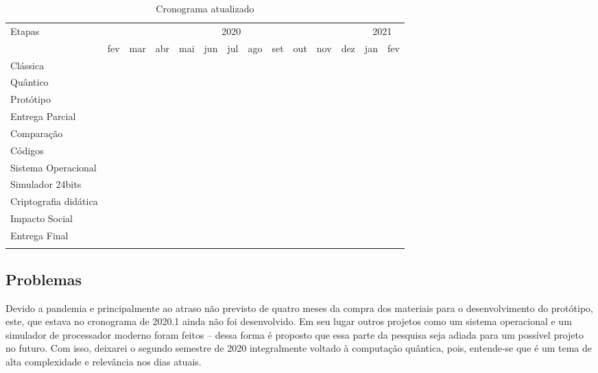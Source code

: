 \vspace{1cm}
\begin{longtable}{ |p{2.5cm}||p{0.60cm}|p{0.60cm}|p{0.60cm}|p{0.60cm}|p{0.60cm}|p{0.60cm}|p{0.60cm}|p{0.60cm}|p{0.60cm}|p{0.60cm}|p{0.60cm}|p{0.60cm}|p{0.60cm}|  }
  \hline
  \multirow{2}{*}{Etapas} & 
  \multicolumn{11}{|c|}{2020} & 
  \multicolumn{2}{|c|}{2021} \\
        &
    fev &
    mar &
    abr &
    mai &
    jun &
    jul &
    ago &
    set &
    out &
    nov &
    dez &
    jan &
    fev \\
  \hline
  Clássica & &
  \multicolumn{6}{|c|}{\cellcolor{green!25}} & 
  & & & & & \\
  \hline
  Quântico & &
  \multicolumn{1}{|c|}{\cellcolor{green!25}} & 
  & & & &
  \multicolumn{2}{|c|}{\cellcolor{green!25}} & 
  \multicolumn{4}{|c|}{\cellcolor{blue!25}} & 
  \\
  \hline
  Protótipo & & & & &
  \multicolumn{1}{|c|}{\cellcolor{green!25}} & 
  & & & & & & & \\
  \hline
  Entrega Parcial & & & &
  \multicolumn{5}{|c|}{\cellcolor{green!25}} & 
  & & & & \\
  \hline
  Comparação & & & & & & & & & &
  \multicolumn{2}{|c|}{\cellcolor{blue!25}} & 
  & \\
  \hline
  Códigos & &
  \multicolumn{7}{|c|}{\cellcolor{green!25}} & 
  \multicolumn{4}{|c|}{\cellcolor{blue!25}} & 
  \\
  \hline
  Sistema Operacional & & &
  \multicolumn{5}{|c|}{\cellcolor{green!25}} & 
  & & & & & 
  \\
  \hline
  Simulador 24bits & & &
  \multicolumn{5}{|c|}{\cellcolor{green!25}} & 
  & & & & & 
  \\
  \hline
  Criptografia didática & & & & &
  \multicolumn{2}{|c|}{\cellcolor{green!25}} & 
  & & 
  \multicolumn{3}{|c|}{\cellcolor{blue!25}} & 
  &
  \\
  \hline
  Impacto Social & & & & & &
  \multicolumn{2}{|c|}{\cellcolor{green!25}} & 
  & &
  \multicolumn{2}{|c|}{\cellcolor{blue!25}} & 
  & \\
  \hline
  Entrega Final & & & & & & &
  \multicolumn{2}{|c|}{\cellcolor{green!25}} & 
  \multicolumn{5}{|c|}{\cellcolor{blue!25}} \\
  \hline
  \caption{Cronograma atualizado}
  \label{updated_timeline}
\end{longtable}
\vspace{1cm}

\subsection{Problemas}
\label{problems}
Devido a pandemia e principalmente ao atraso não previsto de quatro meses da compra dos materiais para o desenvolvimento do protótipo, este, que estava no cronograma de 2020.1 ainda não foi desenvolvido. Em seu lugar outros projetos como um sistema operacional e um simulador de processador moderno foram feitos – dessa forma  é proposto que essa parte da pesquisa seja adiada para um possível projeto no futuro. Com isso, deixarei o segundo semestre de 2020 integralmente voltado à computação quântica, pois, entende-se que é um tema de alta complexidade e relevância nos dias atuais.

\newpage
